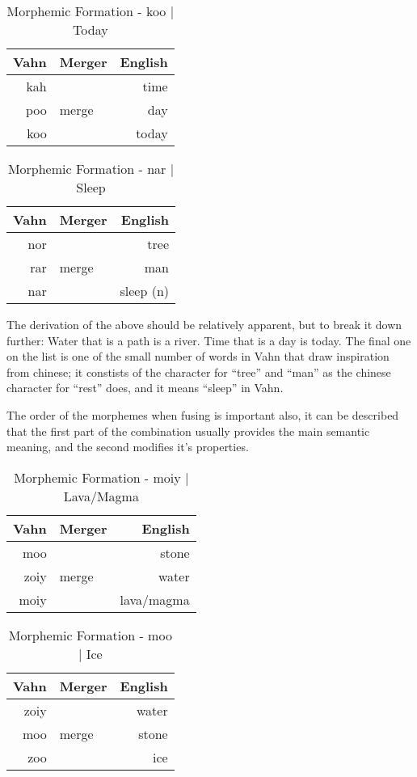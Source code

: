 \documentclass{article}
\begin{document}
\begin{table}[H]
\centering
\begin{tabular}{r|l||r}
Vahn     & Merger & English  \\
\hline\hline
kah &       & time      \\
poo & merge  & day    \\
\hline \hline
koo &        & today
\end{tabular}
\caption{Morphemic Formation - koo | Today}
\label{Morphemic Formation - koo | Today}
\end{table}

\begin{table}[H]
\centering
\begin{tabular}{r|l||r}
Vahn     & Merger & English  \\
\hline\hline
nor &       & tree      \\
rar & merge  & man    \\
\hline \hline
nar &        & sleep (n)
\end{tabular}
\caption{Morphemic Formation - nar | Sleep}
\label{Morphemic Formation - nar | Sleep}
\end{table}

The derivation of the above should be relatively apparent, but to break it down further: Water that is a path is a river. Time that is a day is today. The final one on the list is one of the small number of words in Vahn that draw inspiration from chinese; it constists of the character for ``tree'' and ``man'' as the chinese character for ``rest'' does, and it means ``sleep'' in Vahn.

The order of the morphemes when fusing is important also, it can be described that the first part of the combination usually provides the main semantic meaning, and the second modifies it's properties.

\begin{table}[H]
\centering
\begin{tabular}{r|l||r}
Vahn     & Merger & English  \\
\hline\hline
moo &       & stone \\
zoiy & merge  & water\\
\hline \hline
moiy &        & lava/magma
\end{tabular}
\caption{Morphemic Formation - moiy | Lava/Magma}
\label{Morphemic Formation - moiy | Lava/Magma}
\end{table}

\begin{table}[H]
\centering
\begin{tabular}{r|l||r}
Vahn     & Merger & English  \\
\hline\hline
zoiy &       & water      \\
moo & merge  & stone    \\
\hline \hline
zoo &        & ice
\end{tabular}
\caption{Morphemic Formation - moo | Ice}
\label{Morphemic Formation - moo | Ice}
\end{table}
\end{document}
